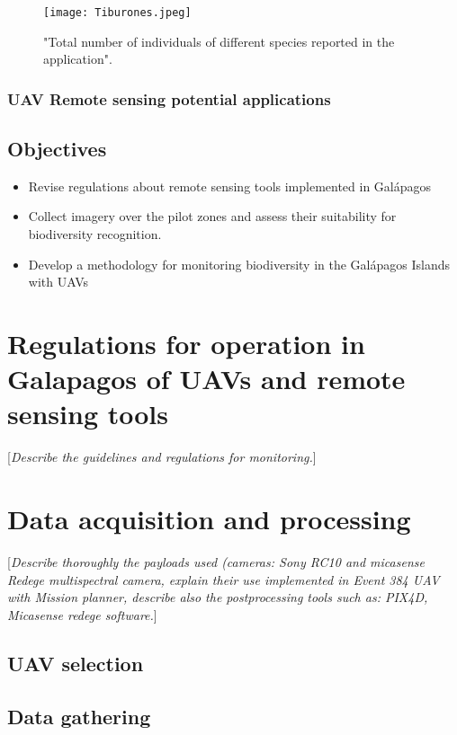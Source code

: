 \documentclass[10pt,english, openany]{book}
\begin{document}
\begin{figure}[h!]
    \centering 
    \texttt{[image: Tiburones.jpeg]}
    \caption{"Total number of individuals of different species reported in the application".\cite{DDU-UNAM2018}}
    \label{fig23:spect}
\end{figure}


\subsection{UAV Remote sensing potential applications}


\section{Objectives}

\begin{itemize}
    \item Revise regulations about remote sensing tools implemented in Galápagos
    \item Collect imagery over the pilot zones and assess their suitability for biodiversity recognition.
    \item Develop a methodology for monitoring biodiversity in the Galápagos Islands with UAVs 
\end{itemize}

\chapter{Regulations for operation in Galapagos of UAVs and remote sensing tools}\label{chapt:doe}
[\textit{Describe the guidelines and regulations for monitoring.}]

\chapter{Data acquisition and processing}\label{chapt:model}
[\textit{Describe thoroughly the payloads used (cameras: Sony RC10 and micasense Redege multispectral camera, explain their use implemented in Event 384  UAV with Mission planner, describe also the postprocessing tools such as: PIX4D, Micasense redege software.}]
\section{UAV selection}
\section{Data gathering}
\end{document}
